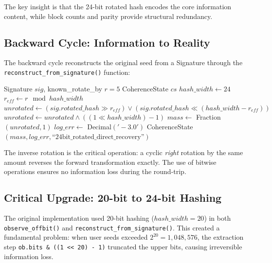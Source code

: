 \documentclass[11pt,letterpaper]{article}
\begin{document}
The key insight is that the 24-bit rotated hash encodes the core information content, while block counts and parity provide structural redundancy.

\subsection{Backward Cycle: Information to Reality}
\label{subsec:backward}

The backward cycle reconstructs the original seed from a Signature through the \texttt{reconstruct\_from\_signature()} function:

\begin{algorithm}[H]
\caption{Backward Cycle: \texttt{reconstruct\_from\_signature()}}
\begin{algorithmic}[1]
\REQUIRE Signature $sig$, known\_rotate\_by $r=5$
\ENSURE CoherenceState $cs$
\STATE $hash\_width \leftarrow 24$
\STATE $r_{eff} \leftarrow r \mod hash\_width$ 
\STATE $unrotated \leftarrow (sig.rotated\_hash \gg r_{eff}) \lor (sig.rotated\_hash \ll (hash\_width - r_{eff}))$ 
\STATE $unrotated \leftarrow unrotated \land ((1 \ll hash\_width) - 1)$ 
\STATE $mass \leftarrow$ Fraction$(unrotated, 1)$ 
\STATE $log\_err \leftarrow$ Decimal$('-3.0')$ 
\RETURN CoherenceState$(mass, log\_err, \text{``24bit\_rotated\_direct\_recovery''})$
\end{algorithmic}
\end{algorithm}

The inverse rotation is the critical operation: a cyclic \textit{right} rotation by the same amount reverses the forward transformation exactly. The use of bitwise operations ensures no information loss during the round-trip.

\subsection{Critical Upgrade: 20-bit to 24-bit Hashing}
\label{subsec:upgrade}

The original implementation used 20-bit hashing ($hash\_width = 20$) in both \texttt{observe\_offbit()} and \texttt{reconstruct\_from\_signature()}. This created a fundamental problem: when user seeds exceeded $2^{20} = 1,048,576$, the extraction step \texttt{ob.bits \& ((1 << 20) - 1)} truncated the upper bits, causing irreversible information loss.
\end{document}

